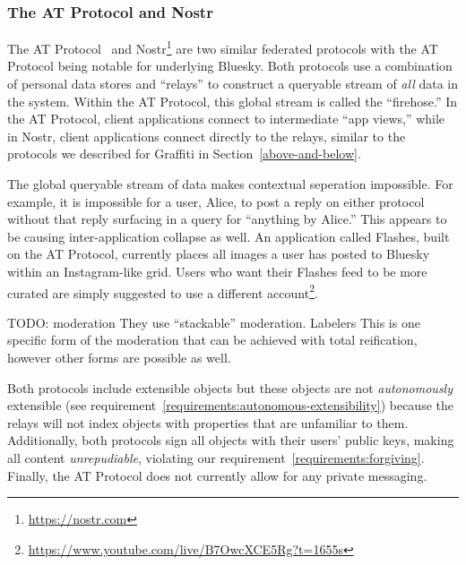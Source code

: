 

\subsubsection{The AT Protocol and Nostr}

The AT Protocol~\cite{bluesky} and Nostr\footnote{
\url{https://nostr.com}
} are two similar federated protocols
with the AT Protocol being notable for underlying Bluesky.
Both protocols use a combination of personal data stores and ``relays''
to construct a queryable stream of \emph{all} data in the system.
Within the AT Protocol, this global stream is called the ``firehose.''
In the AT Protocol, client applications connect to intermediate ``app views,''
while in Nostr, client applications connect directly to the relays, similar
to the protocols we described for Graffiti in Section~\ref{above-and-below}.

The global queryable stream of data makes contextual seperation impossible.
For example, it is impossible for a user, Alice, to post a reply on either protocol
without that reply surfacing in a query for ``anything by Alice.''
This appears to be causing inter-application collapse as well.
An application called Flashes, built on the AT Protocol,
currently places all images a user has posted to Bluesky within
an Instagram-like grid. Users who want their Flashes feed to be
more curated are simply suggested to use a different account\footnote{
    \url{https://www.youtube.com/live/B7OwcXCE5Rg?t=1655s}
}.

TODO: moderation
They use ``stackable'' moderation. Labelers
This is one specific form of the moderation that
can be achieved with total reification, however
other forms are possible as well.

Both protocols include extensible objects but these objects are not
\emph{autonomously} extensible (see requirement~\ref{requirements:autonomous-extensibility})
because the relays will not index objects with properties that are unfamiliar to them.
Additionally, both protocols sign all objects with their users' public keys, making
all content \emph{unrepudiable}, violating our requirement~\ref{requirements:forgiving}.
Finally, the AT Protocol does not currently allow for
any private messaging.


